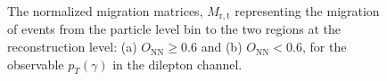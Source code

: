 \begin{figure}[ht]
    \centering
    \quad\quad

    \caption{The normalized migration matrices, $M_{\mathrm{r,t}}$ representing the migration of events from the particle level bin to the two regions at the reconstruction level: (a) $O_{\mathrm{NN}} \geq 0.6$ and (b) $O_{\mathrm{NN}} < 0.6$, for the observable $p_T(\gamma)$ in the dilepton channel.}
    \label{fig:folding_input_migration_dilep}
\end{figure}
\FloatBarrier

